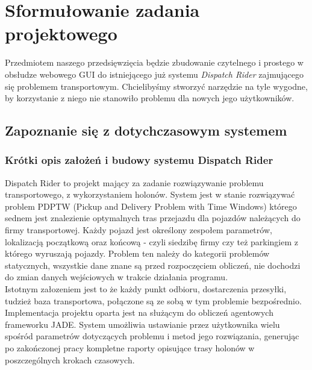 \chapter{Sformułowanie zadania projektowego}
Przedmiotem naszego przedsięwzięcia będzie zbudowanie czytelnego 
i prostego w obsłudze webowego GUI do istniejącego już systemu
\emph{Dispatch Rider} zajmującego się problemem transportowym.
Chcielibyśmy stworzyć narzędzie na tyle wygodne, by korzystanie z
niego nie stanowiło problemu dla nowych jego użytkowników.

\section{Zapoznanie się z dotychczasowym systemem}

\subsection{Krótki opis założeń i budowy systemu Dispatch Rider}
Dispatch Rider to projekt mający za zadanie rozwiązywanie problemu transportowego, z wykorzystaniem holonów. System jest w stanie rozwiązywać problem PDPTW (Pickup and Delivery Problem with Time Windows) którego sednem jest znalezienie optymalnych tras przejazdu dla pojazdów należących do firmy transportowej. Każdy pojazd jest określony zespołem parametrów, lokalizacją początkową oraz końcową - czyli siedzibę firmy czy też parkingiem z którego wyruszają pojazdy.
Problem ten należy do kategorii problemów statycznych, wszystkie dane znane są przed rozpoczęciem obliczeń, nie dochodzi do zmian danych wejściowych w trakcie działania programu.\\Istotnym załozeniem jest to że każdy punkt odbioru, dostarczenia przesyłki, tudzież baza transportowa, połączone są ze sobą w tym problemie bezpośrednio.\\
Implementacja projektu oparta jest na służącym do obliczeń agentowych frameworku JADE. System umożliwia ustawianie przez użytkownika wielu spośród parametrów dotyczących problemu i metod jego rozwiązania, generując po zakończonej pracy kompletne raporty opisujące trasy holonów w poszczególnych krokach czasowych. 

